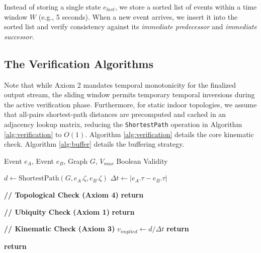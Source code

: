 \documentclass[conference]{IEEEtran}
\providecommand{\RETURN}{\STATE \textbf{return} }
\begin{document}
Instead of storing a single state $e_{last}$, we store a sorted list of events within a time window $W$ (e.g., 5 seconds). When a new event arrives, we insert it into the sorted list and verify consistency against its \textit{immediate predecessor} and \textit{immediate successor}.

\subsection{The Verification Algorithms}

Note that while Axiom 2 mandates temporal monotonicity for the finalized output stream, the sliding window permits temporary temporal inversions during the active verification phase. Furthermore, for static indoor topologies, we assume that all-pairs shortest-path distances are precomputed and cached in an adjacency lookup matrix, reducing the \texttt{ShortestPath} operation in Algorithm \ref{alg:verification} to $O(1)$. Algorithm \ref{alg:verification} details the core kinematic check. Algorithm \ref{alg:buffer} details the buffering strategy.

\begin{algorithm}[h]
\caption{Kinematic \& Topological Consistency Function}
\begin{algorithmic}[1]
\REQUIRE Event $e_A$, Event $e_B$, Graph $G$, $V_{max}$
\ENSURE Boolean Validity

\STATE $d \leftarrow \text{ShortestPath}(G, e_A.\zeta, e_B.\zeta)$
\STATE $\Delta t \leftarrow |e_A.\tau - e_B.\tau|$

\STATE \textbf{// Topological Check (Axiom 4)}
    \RETURN \FALSE {}
\ENDIF

\STATE \textbf{// Ubiquity Check (Axiom 1)}
    \RETURN \FALSE {}
\ENDIF

\STATE \textbf{// Kinematic Check (Axiom 3)}
    \STATE $v_{implied} \leftarrow d / \Delta t$
        \RETURN \FALSE {}
    \ENDIF
\ENDIF

\RETURN \TRUE
\end{algorithmic}
\label{alg:verification}
\end{algorithm}
\end{document}
